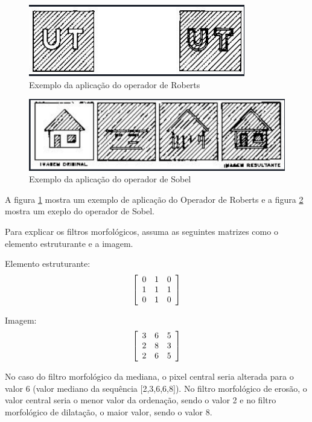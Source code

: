 \documentclass{article}
\begin{document}
\begin{figure}[!ht]
    \centering
    \includegraphics[scale=0.8]{Figure/figura4.PNG} 
    \caption{Exemplo da aplicação do operador de Roberts}
    \label{fig:figura4}
\end{figure}

\begin{figure}[!ht]
    \centering
    \includegraphics[scale=0.8]{Figure/figura3.PNG} 
    \caption{Exemplo da aplicação do operador de Sobel}
    \label{fig:figura3}
\end{figure}

A figura \ref{fig:figura4} mostra um exemplo de aplicação do Operador de Roberts e a figura \ref{fig:figura3} mostra um exeplo do operador de Sobel.

\par Para explicar os filtros morfológicos, assuma as seguintes matrizes como o elemento estruturante e a imagem.

Elemento estruturante:
$$\left[
    \begin{array}{c c c}
    0 & 1 & 0\\
    1 & 1 & 1\\
    0 & 1 & 0\\
    \end{array}\right]$$
    
Imagem:
$$\left[
    \begin{array}{c c c}
    3 & 6 & 5\\
    2 & 8 & 3\\
    2 & 6 & 5\\
    \end{array}\right]$$
    
No caso do filtro morfológico da mediana, o pixel central seria alterada para o valor 6 (valor mediano da sequência [2,3,6,6,8]).
No filtro morfológico de erosão, o valor central seria o menor valor da ordenação, sendo o valor 2 e no filtro morfológico de dilatação, o maior valor, sendo o valor 8.
\end{document}
